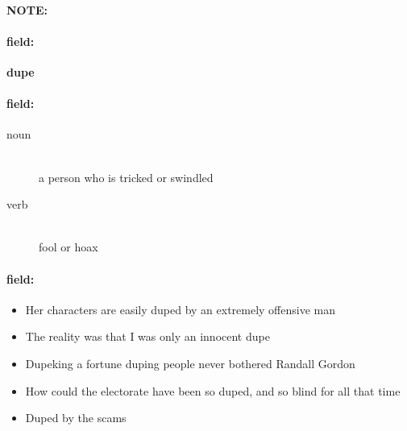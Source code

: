 \documentclass[12pt]{article}
\newenvironment{note}{\paragraph{NOTE:}}{}
\newenvironment{field}{\paragraph{field:}}{}
\begin{document}
\begin{note}
\begin{field}
\textbf{\large dupe}
\end{field}


\begin{field}
\begin{description}
\item[noun] \hfill \\ 
a person who is tricked or swindled

\item[verb] \hfill \\ 
fool or hoax

\end{description}
\end{field}

\begin{field}
\begin{itemize}
\item Her characters are easily duped by an extremely offensive man
\item The reality was that I was only an innocent dupe
\item Dupeking a fortune duping people never bothered Randall Gordon
\item How could the electorate have been so duped, and so blind for all that time
\item Duped by the scams
\end{itemize}
\end{field}
\end{note}
\end{document}
